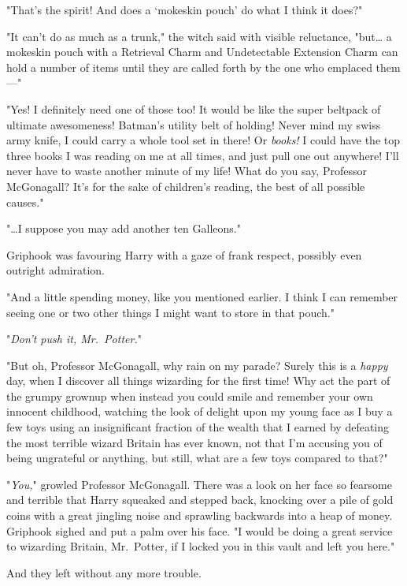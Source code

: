 "That's the spirit! And does a `mokeskin pouch' do what I think it does?"

"It can't do as much as a trunk," the witch said with visible reluctance,
"but{\ldots} a mokeskin pouch with a Retrieval Charm and Undetectable Extension
Charm can hold a number of items until they are called forth by the one who
emplaced them---"

"Yes! I definitely need one of those too! It would be like the super beltpack
of ultimate awesomeness! Batman's utility belt of holding! Never mind my swiss
army knife, I could carry a whole tool set in there! Or \emph{books!} I could
have the top three books I was reading on me at all times, and just pull one
out anywhere! I'll never have to waste another minute of my life! What do you
say, Professor McGonagall? It's for the sake of children's reading, the best of
all possible causes."

"{\ldots}I suppose you may add another ten Galleons."

Griphook was favouring Harry with a gaze of frank respect, possibly even
outright admiration.

"And a little spending money, like you mentioned earlier. I think I can
remember seeing one or two other things I might want to store in that pouch."

"\emph{Don't push it, Mr.~Potter.}"

"But oh, Professor McGonagall, why rain on my parade? Surely this is a
\emph{happy} day, when I discover all things wizarding for the first time! Why
act the part of the grumpy grownup when instead you could smile and remember
your own innocent childhood, watching the look of delight upon my young face as
I buy a few toys using an insignificant fraction of the wealth that I earned by
defeating the most terrible wizard Britain has ever known, not that I'm
accusing you of being ungrateful or anything, but still, what are a few toys
compared to that?"

"\emph{You,}" growled Professor McGonagall. There was a look on her face so
fearsome and terrible that Harry squeaked and stepped back, knocking over a
pile of gold coins with a great jingling noise and sprawling backwards into a
heap of money. Griphook sighed and put a palm over his face. "I would be doing
a great service to wizarding Britain, Mr.~Potter, if I locked you in this vault
and left you here."

And they left without any more trouble.
